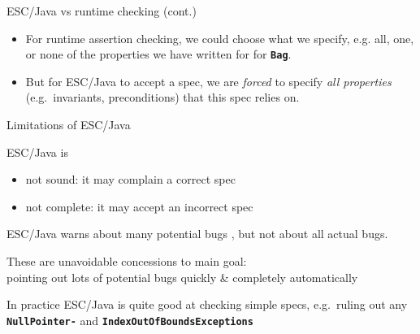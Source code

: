 \documentclass[
nocolorBG,
slideColor,
pdf,
erik,
]{prosper}
\newcommand{\code}[1]{{\rm \texttt{\textbf{\small #1}}}}
\begin{document}

\begin{slide}{ESC/Java vs runtime checking (cont.)}
\vspace*{-3ex}
\begin{itemize}
\item For {\green runtime assertion checking}, we could {\green choose
    what we specify}, e.g. all, one, or none of the properties we have
  written for for \code{Bag}.
\item But for {\blue ESC/Java} to accept a spec, we are {\em {\blue
      forced}} to specify {\em {\blue all properties}} (e.g.\ 
  invariants, preconditions) that this spec relies on.
\end{itemize}
\end{slide}

\begin{slide}{Limitations of ESC/Java}
\vspace*{-3ex}

ESC/Java is
\begin{itemize}
\item {\blue not sound}: it may {\green complain a correct spec}
\item {\blue not complete}: it may {\green accept an incorrect spec}
\end{itemize}
ESC/Java warns about {\green many potential bugs} , but {\green not
  about all actual bugs.}

\medskip

These are unavoidable concessions to main goal:\\
{\green pointing out lots of potential bugs quickly \& completely
  automatically}

\medskip

In practice ESC/Java is quite good at checking simple specs, e.g.\ 
ruling out any \code{NullPointer-} and
\code{IndexOutOfBounds\-Exceptions}

\end{slide}
\end{document}

